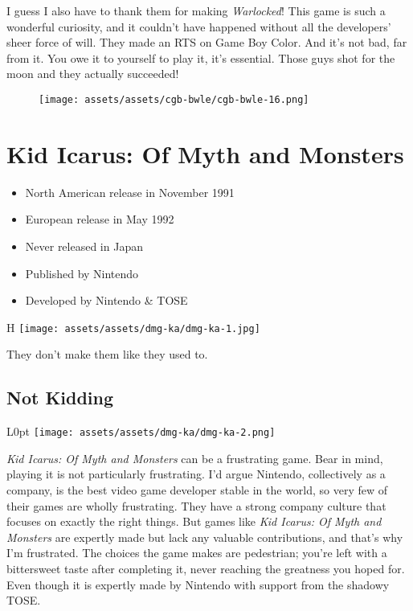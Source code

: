 \documentclass{book}
\begin{document}
I guess I also have to thank them for making \emph{Warlocked}! This game is such a wonderful curiosity, and it couldn’t have happened without all the developers’ sheer force of will. They made an RTS on Game Boy Color. And it’s not bad, far from it. You owe it to yourself to play it, it’s essential. Those guys shot for the moon and they actually succeeded!

\begin{figure}[hbt]
\vskip 10pt
\centering \texttt{[image: assets/assets/cgb-bwle/cgb-bwle-16.png]}
\vskip 6pt
\end{figure}


\begingroup \chapter*{Kid Icarus: Of Myth and Monsters} \endgroup

\begin{itemize} \setlength\itemsep{-0.4em}
\item North American release in November 1991
\item European release in May 1992
\item Never released in Japan
\item Published by Nintendo
\item Developed by Nintendo \& TOSE
\end{itemize}\noindent

\begin{wrapfigure}{H}{\linewidth}
\vskip 4pt
\centering \texttt{[image: assets/assets/dmg-ka/dmg-ka-1.jpg]}\par\pagetwodescription They don’t make them like they used to.\end{wrapfigure}
\clearpage

\FloatBarrier\needspace{10mm}\section*{Not Kidding}\nopagebreak[4]

\begin{wrapfigure}{L}{0pt} \texttt{[image: assets/assets/dmg-ka/dmg-ka-2.png]}\end{wrapfigure}
\emph{Kid Icarus: Of Myth and Monsters} can be a frustrating game. Bear in mind, playing it is not particularly frustrating. I’d argue Nintendo, collectively as a company, is the best video game developer stable in the world, so very few of their games are wholly frustrating. They have a strong company culture that focuses on exactly the right things. But games like \emph{Kid Icarus: Of Myth and Monsters} are expertly made but lack any valuable contributions, and that’s why I’m frustrated. The choices the game makes are pedestrian; you’re left with a bittersweet taste after completing it, never reaching the greatness you hoped for. Even though it is expertly made by Nintendo with support from the shadowy TOSE.
\end{document}
